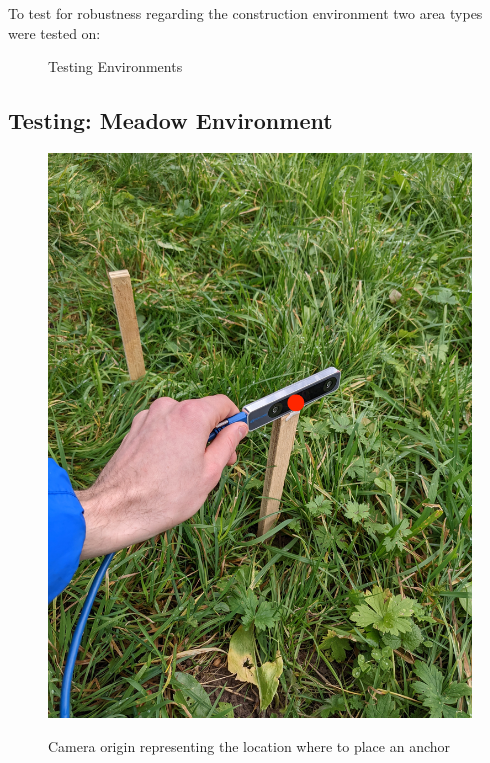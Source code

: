To test for robustness regarding the construction environment two area types were tested on:

\begin{figure}[htp]
    \centering
        \hfill
        \hfill
    \caption{Testing Environments}
    \label{fig:environments}
\end{figure}
\clearpage


\subsection{Testing: Meadow Environment}\label{subsec:meadow}


\begin{figure}[ht]
    \centering
    \includegraphics[scale = 0.1]{images/colocalization/meadow_start.jpg}
    \label{fig:meadow_start}
    \caption{Camera origin representing the location where to place an anchor}
\end{figure}
\clearpage

